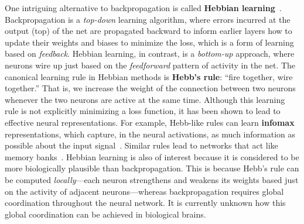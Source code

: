 One intriguing alternative to backpropagation is called \textbf{Hebbian learning}~\cite{hebb2005organization}. Backpropagation is a \textit{top-down} learning algorithm, where errors incurred at the output (top) of the net are propagated backward to inform earlier layers how to update their weights and biases to minimize the loss, which is a form of learning based on \textit{feedback}. Hebbian learning, in contrast, is a \textit{bottom-up} approach, where neurons wire up just based on the \textit{feedforward} pattern of activity in the net. The canonical learning rule in Hebbian methods is \textbf{Hebb's rule}: ``fire together, wire together.'' That is, we increase the weight of the connection between two neurons whenever the two neurons are active at the same time. Although this learning rule is not explicitly minimizing a loss function, it has been shown to lead to effective neural representations. For example, Hebb-like rules can learn \textbf{infomax} representations, which capture, in the neural activations, as much information as possible about the input signal~\cite{linsker1988self}. Similar rules lead to networks that act like memory banks~\cite{hopfield1982neural}. Hebbian learning is also of interest because it is considered to be more biologically plausible than backpropagation. This is because Hebb's rule can be computed \textit{locally}—each neuron strengthens and weakens its weights based just on the activity of adjacent neurons—whereas backpropagation requires global coordination throughout the neural network. It is currently unknown how this global coordination can be achieved in biological brains.




